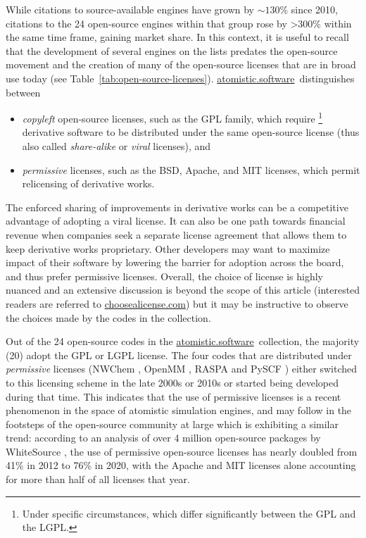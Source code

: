 \documentclass[9pt,review]{livecoms}
\newcommand{\atsoft}{\href{https://atomistic.software}{atomistic.software}\ }
\begin{document}
While citations to source-available engines have grown by ${\sim}130\%$ since 2010, 
citations to the 24 open-source engines within that group rose by >300\% within the same time frame, gaining market share.
In this context, it is useful to recall that the development of several engines on the lists predates the open-source movement and the creation of many of the open-source licenses that are in broad use today (see Table~\ref{tab:open-source-licenses}).
\atsoft distinguishes between 
\begin{itemize}
    \item 
        \emph{copyleft} open-source licenses, such as the GPL family, which require%
\footnote{Under specific circumstances, which differ significantly between the GPL and the LGPL.}
        derivative software to be distributed under the same open-source license (thus also called \emph{share-alike} or \emph{viral} licenses), and
\item
\emph{permissive} licenses, such as the BSD, Apache, and MIT licenses, which permit relicensing of derivative works.
\end{itemize}

The enforced sharing of improvements in derivative works can be a competitive advantage of adopting a viral license. 
It can also be one path towards financial revenue when companies seek a separate license agreement that allows them to keep derivative works proprietary.
Other developers may want to maximize impact of their software by lowering the barrier for adoption across the board, and thus prefer permissive licenses.
Overall, the choice of license is highly nuanced and an extensive discussion is beyond the scope of this article (interested readers are referred to \url{choosealicense.com}) but it may be instructive to observe the choices made by the codes in the collection.

Out of the 24 open-source codes in the \atsoft collection, the majority (20) adopt the GPL or LGPL license.
The four codes that are distributed under \emph{permissive} licenses (NWChem \cite{Apra2020}, OpenMM \cite{Eastman2017}, RASPA \cite{Dubbeldam2016a} and PySCF \cite{Sun2020a}) either switched to this licensing scheme in the late 2000s or 2010s or started being developed during that time.
This indicates that the use of permissive licenses is a recent phenomenon in the space of atomistic simulation engines, and may follow in the footsteps of the open-source community at large which is exhibiting a similar trend:
according to an analysis of over 4 million open-source packages by WhiteSource \cite{WhiteSource2021}, the use of permissive open-source licenses has nearly doubled from 41\% in 2012 to 76\% in 2020, with the Apache and MIT licenses alone accounting for more than half of all licenses that year.
\end{document}
